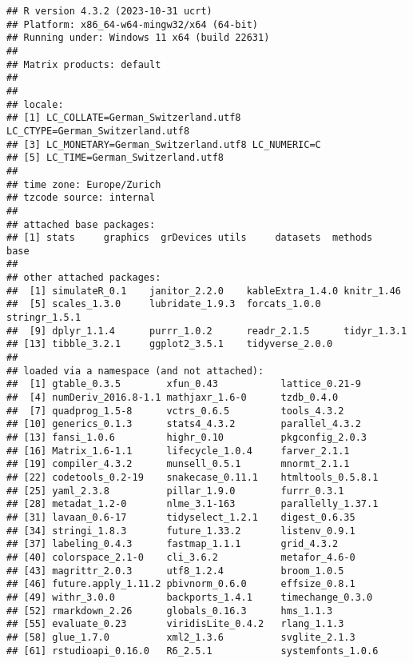 \documentclass[
]{article}
\begin{document}
\begin{verbatim}
## R version 4.3.2 (2023-10-31 ucrt)
## Platform: x86_64-w64-mingw32/x64 (64-bit)
## Running under: Windows 11 x64 (build 22631)
## 
## Matrix products: default
## 
## 
## locale:
## [1] LC_COLLATE=German_Switzerland.utf8  LC_CTYPE=German_Switzerland.utf8   
## [3] LC_MONETARY=German_Switzerland.utf8 LC_NUMERIC=C                       
## [5] LC_TIME=German_Switzerland.utf8    
## 
## time zone: Europe/Zurich
## tzcode source: internal
## 
## attached base packages:
## [1] stats     graphics  grDevices utils     datasets  methods   base     
## 
## other attached packages:
##  [1] simulateR_0.1    janitor_2.2.0    kableExtra_1.4.0 knitr_1.46      
##  [5] scales_1.3.0     lubridate_1.9.3  forcats_1.0.0    stringr_1.5.1   
##  [9] dplyr_1.1.4      purrr_1.0.2      readr_2.1.5      tidyr_1.3.1     
## [13] tibble_3.2.1     ggplot2_3.5.1    tidyverse_2.0.0 
## 
## loaded via a namespace (and not attached):
##  [1] gtable_0.3.5        xfun_0.43           lattice_0.21-9     
##  [4] numDeriv_2016.8-1.1 mathjaxr_1.6-0      tzdb_0.4.0         
##  [7] quadprog_1.5-8      vctrs_0.6.5         tools_4.3.2        
## [10] generics_0.1.3      stats4_4.3.2        parallel_4.3.2     
## [13] fansi_1.0.6         highr_0.10          pkgconfig_2.0.3    
## [16] Matrix_1.6-1.1      lifecycle_1.0.4     farver_2.1.1       
## [19] compiler_4.3.2      munsell_0.5.1       mnormt_2.1.1       
## [22] codetools_0.2-19    snakecase_0.11.1    htmltools_0.5.8.1  
## [25] yaml_2.3.8          pillar_1.9.0        furrr_0.3.1        
## [28] metadat_1.2-0       nlme_3.1-163        parallelly_1.37.1  
## [31] lavaan_0.6-17       tidyselect_1.2.1    digest_0.6.35      
## [34] stringi_1.8.3       future_1.33.2       listenv_0.9.1      
## [37] labeling_0.4.3      fastmap_1.1.1       grid_4.3.2         
## [40] colorspace_2.1-0    cli_3.6.2           metafor_4.6-0      
## [43] magrittr_2.0.3      utf8_1.2.4          broom_1.0.5        
## [46] future.apply_1.11.2 pbivnorm_0.6.0      effsize_0.8.1      
## [49] withr_3.0.0         backports_1.4.1     timechange_0.3.0   
## [52] rmarkdown_2.26      globals_0.16.3      hms_1.1.3          
## [55] evaluate_0.23       viridisLite_0.4.2   rlang_1.1.3        
## [58] glue_1.7.0          xml2_1.3.6          svglite_2.1.3      
## [61] rstudioapi_0.16.0   R6_2.5.1            systemfonts_1.0.6
\end{verbatim}
\end{document}
